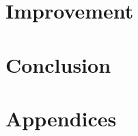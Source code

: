 \documentclass[a4paper, 12pt]{report}
\begin{document}
\newpage
\section{Improvement}

\newpage
\section{Conclusion}

\newpage



\newpage
\appendix
\section*{Appendices}
\renewcommand{\thesubsection}{\Alph{subsection}}
\end{document}
